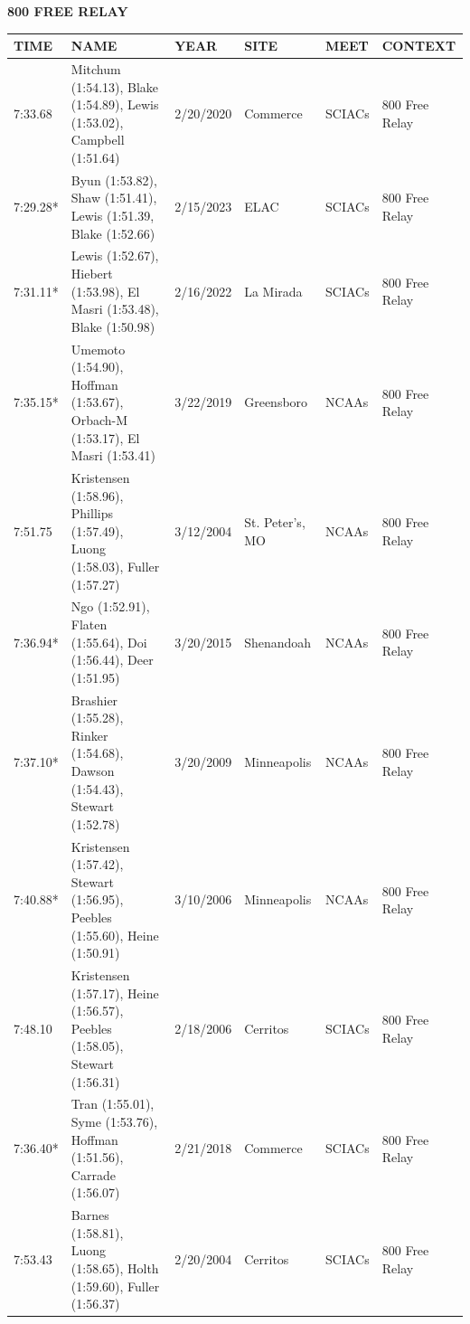 \begin{table}[H]
\centering
\begin{minipage}[t]{0.6\textwidth}
\centering
\textbf{800 FREE RELAY}\\[0.1cm]
\begin{tabular}{@{}p{1.8cm}p{2.8cm}p{1.2cm}p{1.4cm}p{1.4cm}p{2.0cm}@{}}
\hline
    \textbf{TIME} & \textbf{NAME} & \textbf{YEAR} & \textbf{SITE} & \textbf{MEET} & \textbf{CONTEXT} \\
\hline
    7:33.68 & Mitchum (1:54.13), Blake (1:54.89), Lewis (1:53.02), Campbell (1:51.64) & 2/20/2020 & Commerce & SCIACs & 800 Free Relay \\
    7:29.28* & Byun (1:53.82), Shaw (1:51.41), Lewis (1:51.39, Blake (1:52.66) & 2/15/2023 & ELAC & SCIACs & 800 Free Relay \\
    7:31.11* & Lewis (1:52.67), Hiebert (1:53.98), El Masri (1:53.48), Blake (1:50.98) & 2/16/2022 & La Mirada & SCIACs & 800 Free Relay \\
    7:35.15* & Umemoto (1:54.90), Hoffman (1:53.67), Orbach-M (1:53.17), El Masri (1:53.41) & 3/22/2019 & Greensboro & NCAAs & 800 Free Relay \\
    7:51.75 & Kristensen (1:58.96), Phillips (1:57.49), Luong (1:58.03), Fuller (1:57.27) & 3/12/2004 & St. Peter's, MO & NCAAs & 800 Free Relay \\
    7:36.94* & Ngo (1:52.91), Flaten (1:55.64), Doi (1:56.44), Deer (1:51.95) & 3/20/2015 & Shenandoah & NCAAs & 800 Free Relay \\
    7:37.10* & Brashier (1:55.28), Rinker (1:54.68), Dawson (1:54.43), Stewart (1:52.78) & 3/20/2009 & Minneapolis & NCAAs & 800 Free Relay \\
    7:40.88* & Kristensen (1:57.42), Stewart (1:56.95), Peebles (1:55.60), Heine (1:50.91) & 3/10/2006 & Minneapolis & NCAAs & 800 Free Relay \\
    7:48.10 & Kristensen (1:57.17), Heine (1:56.57), Peebles (1:58.05), Stewart (1:56.31) & 2/18/2006 & Cerritos & SCIACs & 800 Free Relay \\
    7:36.40* & Tran (1:55.01), Syme (1:53.76), Hoffman (1:51.56), Carrade (1:56.07) & 2/21/2018 & Commerce & SCIACs & 800 Free Relay \\
    7:53.43 & Barnes (1:58.81), Luong (1:58.65), Holth (1:59.60), Fuller (1:56.37) & 2/20/2004 & Cerritos & SCIACs & 800 Free Relay \\
\hline
\end{tabular}
\end{minipage}
\end{table}

